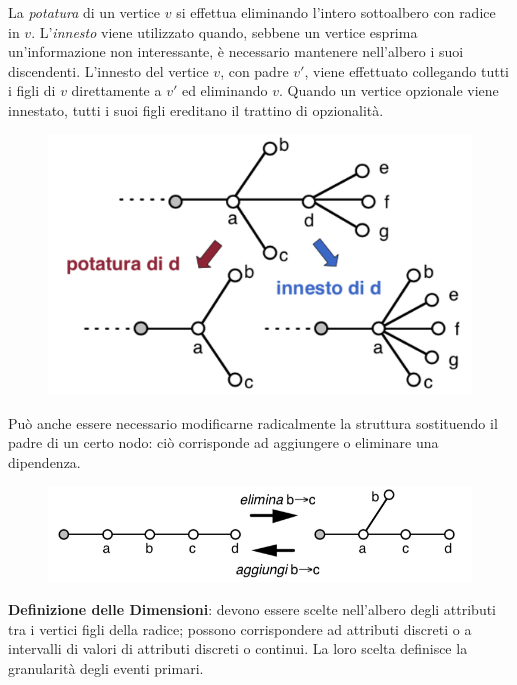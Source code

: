 \documentclass[a4paper, notitlepage, 9pt]{extreport}
\begin{document}
\begin{multicols}{2}
	\noindent
	La \textit{potatura} di un vertice $v$ si effettua eliminando l’intero sottoalbero con radice in $v$. L’\textit{innesto} viene utilizzato quando, sebbene un vertice esprima un’informazione non interessante, è necessario mantenere nell’albero i suoi discendenti. L’innesto del vertice $v$, con padre $v'$, viene effettuato collegando tutti i figli di $v$ direttamente a $v'$ ed eliminando $v$. Quando un vertice opzionale viene innestato, tutti i suoi figli ereditano il trattino di opzionalità.
\columnbreak
	\begin{figure}[H]
		\centering
		\includegraphics[scale=0.39]{Innesto}
	\end{figure}
\end{multicols}
\begin{multicols}{2}	
\noindent
Può anche essere necessario modificarne radicalmente la struttura sostituendo il padre di un certo nodo: ciò corrisponde ad aggiungere o eliminare una dipendenza.
\columnbreak
\begin{figure}[H]
	\centering
	\includegraphics[scale=0.4]{Editing}
\end{figure}
\end{multicols}
\noindent
\textbf{Definizione delle Dimensioni}: devono essere scelte nell’albero degli attributi tra i vertici figli della radice; possono corrispondere ad attributi discreti o a intervalli di valori di attributi discreti o continui. La loro scelta definisce la granularità degli eventi primari. 
\end{document}
